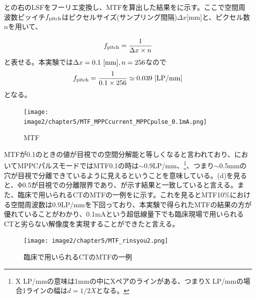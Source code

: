 との右のLSFをフーリエ変換し、MTFを算出した結果をに示す。ここで空間周波数ピッイチ$f_{\rm pitch}$はピクセルサイズ(サンプリング間隔)$\Delta x$[mm]と、ピクセル数$n$を用いて、

\begin{align}
f_{\rm pitch} = \frac{1}{\Delta x\times n}
\end{align}
と表せる。本実験では$\Delta x = 0.1\ {\rm [mm]}, n=256$なので
\begin{align}
f_{\rm pitch} = \frac{1}{0.1\times256}\simeq0.039\ {\rm[LP/mm]}
\end{align}
となる。



\begin{figure}[H]
 \begin{center}
 \texttt{[image: image2/chapter5/MTF\_MPPCcurrent\_MPPCpulse\_0.1mA.png]} 
 \end{center}
 \caption{MTF}
 \label{fig:MTF_matome}
\end{figure}

MTFが0.1のときの値が目視での空間分解能と等しくなると言われており、においてMPPCパルスモードではMTF0.1の時は$\sim$0.9LP/mm、\footnote{X LP/mmの意味は1mmの中にXペアのラインがある、つまりX LP/mmの場合1ラインの幅は$d=1/2X$となる。}、つまり$\sim$0.5mmの穴が目視で分離できているように見えるということを意味している。(d)を見ると、Φ0.5が目視での分離限界であり、が示す結果と一致していると言える。また、臨床で用いられるCTのMTFの一例をに示す。これを見るとMTF10\%における空間周波数は0.9LP/mmを下回っており、本実験で得られたMTFの結果の方が優れていることがわかり、0.1mAという超低線量下でも臨床現場で用いられるCTと劣らない解像度を実現することができたと言える。

\begin{figure}[H]
 \begin{center}
 \texttt{[image: image2/chapter5/MTF\_rinsyou2.png]} 
 \end{center}
 \caption{臨床で用いられるCTのMTFの一例}
 \label{fig:MTF_rinshou}
\end{figure}
